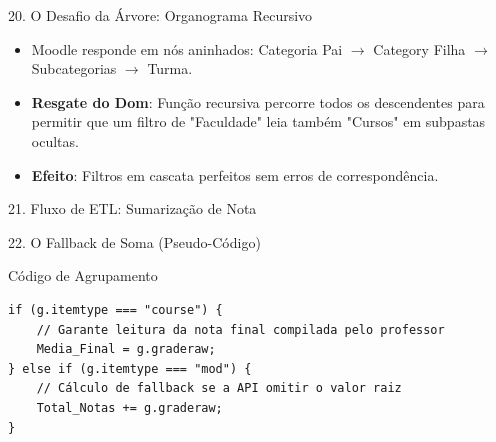 \documentclass[10pt, aspectratio=169]{beamer}
\begin{document}
\begin{frame}{20. O Desafio da Árvore: Organograma Recursivo}
    \begin{itemize}
        \item Moodle responde em nós aninhados: Categoria Pai $\rightarrow$ Category Filha $\rightarrow$ Subcategorias $\rightarrow$ Turma.
        \item \textbf{Resgate do Dom}: Função recursiva percorre todos os descendentes para permitir que um filtro de "Faculdade" leia também "Cursos" em subpastas ocultas.
        \item \textbf{Efeito}: Filtros em cascata perfeitos sem erros de correspondência.
    \end{itemize}
\end{frame}

\begin{frame}{21. Fluxo de ETL: Sumarização de Nota}
    \begin{center}
    \end{center}
\end{frame}

\begin{frame}[fragile]{22. O Fallback de Soma (Pseudo-Código)}
    \vspace{0.3cm}
    \begin{exampleblock}{Código de Agrupamento}
    \begin{lstlisting}
if (g.itemtype === "course") {
    // Garante leitura da nota final compilada pelo professor
    Media_Final = g.graderaw; 
} else if (g.itemtype === "mod") {
    // Cálculo de fallback se a API omitir o valor raiz
    Total_Notas += g.graderaw;
}
    \end{lstlisting}
    \end{exampleblock}
\end{frame}
\end{document}
